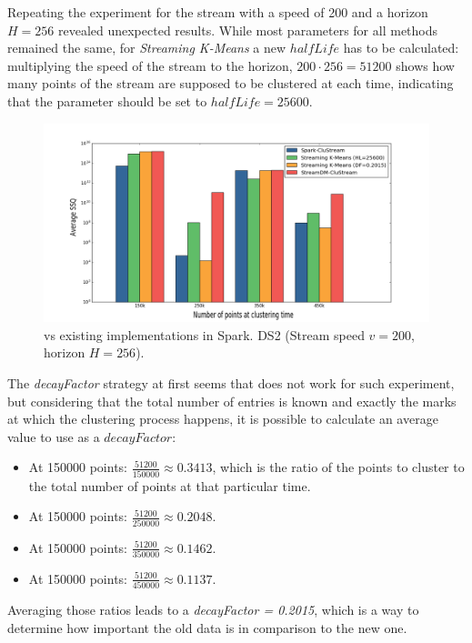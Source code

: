 Repeating the experiment for the stream with a speed of 200 and a horizon $H=256$ revealed unexpected results. While most parameters for all methods remained the same, for \textit{Streaming K-Means} a new $halfLife$ has to be calculated: multiplying the speed of the stream to the horizon, $200\cdot 256=51200$ shows how many points of the stream are supposed to be clustered at each time, indicating that the parameter should be set to $halfLife=25600$. 

\begin{figure}[h!]
 \centering
 \includegraphics[scale=0.25]{./styles/comparison200.png}
 \caption{\our vs existing implementations in Spark. DS2 (Stream speed $v = 200$, horizon $H=256$).}
 \label{fig:comparison200}
\end{figure}

The \textit{decayFactor} strategy at first seems that does not work for such experiment, but considering that the total number of entries is known and exactly the marks at which the clustering process happens, it is possible to calculate an average value to use as a $decayFactor$: 

\begin{itemize}
 \item At 150000 points: $\frac{51200}{150000} \approx 0.3413$, which is the ratio of the points to cluster to the total number of points at that particular time.
 \item At 150000 points: $\frac{51200}{250000} \approx 0.2048$.
 \item At 150000 points: $\frac{51200}{350000} \approx 0.1462$.
 \item At 150000 points: $\frac{51200}{450000} \approx 0.1137$.
\end{itemize}

Averaging those ratios leads to a \textit{decayFactor = 0.2015}, which is a way to determine how important the old data is in comparison to the new one.


